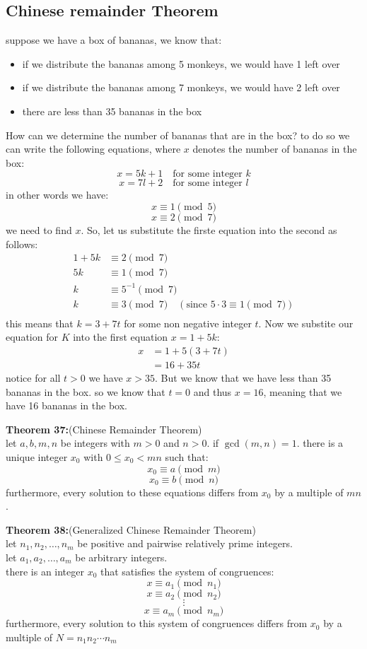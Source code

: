 \documentclass[12pt]{article}
\begin{document}
\subsection{Chinese remainder Theorem}
suppose we have a box of bananas, we know that:
\begin{itemize}
    \item if we distribute the bananas among 5 monkeys, we would have 1 left over
    \item if we distribute the bananas among 7 monkeys, we would have 2 left over
    \item there are less than 35 bananas in the box
\end{itemize}
How can we determine the number of bananas that are in the box? to do so we can write the following equations, where $x$ denotes the number of bananas in the box:
\[ x = 5k + 1 \quad \text{for some integer } k \]
\[ x = 7l + 2 \quad \text{for some integer } l \]
in other words we have:
\[ x \equiv 1 \pmod{5} \]
\[ x \equiv 2 \pmod{7} \]
we need to find $x$. So, let us substitute the firste equation into the second as follows:
\begin{align*}
    1+5k &\equiv 2 \pmod{7} \\
    5k &\equiv 1 \pmod{7} \\
    k &\equiv 5^{-1} \pmod{7} \\
    k &\equiv 3 \pmod{7} \quad (\text{since } 5 \cdot 3 \equiv 1 \pmod{7}) \\
\end{align*}
this means that $k=3+7t$ for some non negative integer $t$. Now we substite our equation for $K$ into the first equation $x=1+5k$:
\begin{align*}
    x &= 1 + 5(3+7t) \\
    &= 16 + 35t
\end{align*}
notice for all $t>0$ we have $x >35$. But we know that we have less than 35 bananas in the box. so we know that $t=0$ and thus $x=16$, meaning that we have 16 bananas in the box.

\vspace{5mm}
\noindent\textbf{Theorem 37:}(Chinese Remainder Theorem)
\\
let $a,b,m,n$ be integers with $m>0$ and $n>0$. if $\gcd(m,n)=1$. there is a unique integer
$x_0$ with $0 \le x_0 < mn$ such that:
\[ x_0 \equiv a \pmod{m} \]
\[ x_0 \equiv b \pmod{n} \]
furthermore, every solution to these equations differs from $x_0$ by a multiple of $mn$.

\vspace{5mm}
\noindent\textbf{Theorem 38:}(Generalized Chinese Remainder Theorem)
\\
let $n_1,n_2, \dots ,n_m$ be positive and pairwise relatively prime integers.
\\
let $a_1,a_2,\dots,a_m$ be arbitrary integers.
\\
there is an integer $x_0$ that satisfies the system of congruences:
\[ x \equiv a_1 \pmod{n_1} \]
\[ x \equiv a_2 \pmod{n_2} \]
\[ \vdots \]
\[ x \equiv a_m \pmod{n_m} \]
furthermore, every solution to this system of congruences differs from $x_0$ by a multiple of $N=n_1 n_2 \cdots n_m$
\end{document}
